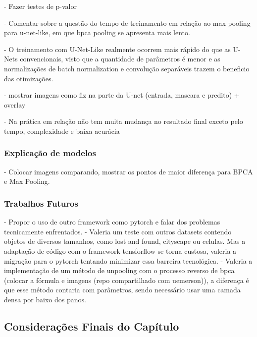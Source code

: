 - Fazer testes de p-valor

- Comentar sobre a questão do tempo de treinamento em relação ao max pooling para u-net-like, em que bpca pooling se apresenta mais lento.

- O treinamento com U-Net-Like realmente ocorrem mais rápido do que as U-Nets convencionais, visto que a quantidade de parâmetros é menor e as normalizações de batch normalization e convolução separáveis trazem o beneficio das otimizações.

- mostrar imagens como fiz na parte da U-net (entrada, mascara e predito) + overlay

- Na prática em relação não tem muita mudança no resultado final exceto pelo tempo, complexidade e baixa acurácia



\subsubsection{Explicação de modelos}
\label{results:semantic:xai}
- Colocar imagens comparando, mostrar os pontos de maior diferença para BPCA e Max Pooling.

\subsubsection{Trabalhos Futuros}
\label{results:semantic:future}
- Propor o uso de outro framework como pytorch e falar dos problemas tecnicamente enfrentados.
- Valeria um teste com outros datasets contendo objetos de diversos tamanhos, como lost and found, cityscape ou celulas. Mas a adaptação de código com o framework tensforflow se torna custosa, valeria a migração para o pytorch tentando minimizar essa barreira tecnológica.
- Valeria a implementação de um método de unpooling com o processo reverso de bpca (colocar a fórmula e imagens (repo compartilhado com uemerson)), a diferença é que esse método contaria com parâmetros, sendo necessário usar uma camada densa por baixo dos panos.


\subsection{Considerações Finais do Capítulo}
\label{result:final}
